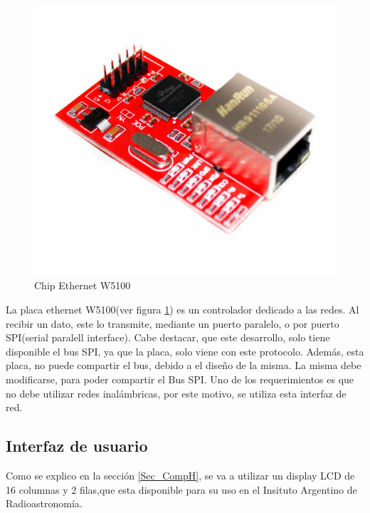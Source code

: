 \begin{figure}[ht]
	\centering	
	\includegraphics[scale=.2]{w5100}  
	\caption{Chip Ethernet W5100}		 
	\label{fig:chip_ethernet}
\end{figure}

La placa ethernet W5100(ver figura \ref{fig:chip_ethernet}) es un controlador dedicado a las redes. Al recibir un dato, este lo transmite, mediante un puerto paralelo, o por puerto SPI(serial paralell interface). Cabe destacar, que este desarrollo, solo tiene disponible el bus SPI, ya que la placa, solo viene con este protocolo. Además, esta placa, no puede compartir el bus, debido a el diseño de la misma. La misma debe modificarse, para poder compartir el Bus SPI. Uno de los requerimientos es que no debe utilizar redes inalámbricas, por este motivo, se utiliza esta interfaz de red. 

\subsection{Interfaz de usuario} \label{Int_u}
Como se explico en la sección \ref{Sec_CompH}, se va a utilizar un display LCD de 16 columnas y 2 filas,que esta disponible para su uso en el Insituto Argentino de Radioastronomía.  
 
